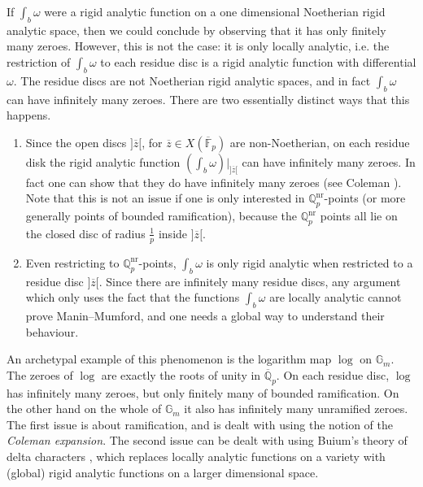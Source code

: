 \documentclass{amsart}
\def\Q{\mathbb Q}
\theoremstyle{definition}
\newcommand{\F}{\mathbb{F}}
\begin{document}
If $\int _b \omega $ were a rigid analytic function on a one dimensional Noetherian rigid analytic space, then we could conclude by observing that it has only finitely many zeroes. However, this is not the case: it is only locally analytic, i.e.  the restriction of $\int _b \omega $ to each residue disc is a rigid analytic function with differential $\omega $. The residue discs are not Noetherian rigid analytic spaces, and in fact $\int _b \omega $ can have infinitely many zeroes. There are two essentially distinct ways that this happens.

\begin{enumerate}
\item Since the open discs $]\overline{z}[$,  for $\overline{z}\in X(\overline{\F }_p )$ are non-Noetherian, on each residue disk the rigid analytic function $(\int _b \omega )|_{]\overline{z}[}$ can have infinitely many zeroes. In fact one can show that they do have infinitely many zeroes (see Coleman \cite{coleman:ramified}). Note that this is not an issue if one is only interested in $\Q _p ^{\mathrm{nr}}$-points (or more generally points of bounded ramification), because the $\Q _p ^{\mathrm{nr}}$ points all lie on the closed disc of radius $\frac{1}{p}$ inside $]\overline{z}[$. 
\item Even restricting to $\Q _p^{\mathrm{nr}}$-points, $\int _b \omega $ is only rigid analytic when restricted to a residue disc $]\overline{z}[$. Since there are infinitely many residue discs, any argument which only uses the fact that the functions $\int _b \omega $ are locally analytic cannot prove Manin--Mumford, and one needs a global way to understand their behaviour.
\end{enumerate}
An archetypal example of this phenomenon is the logarithm map $\log $ on $\mathbb{G}_m$. The zeroes of $\log $ are exactly the roots of unity in $\overline{\Q }_p $. On each residue disc, $\log $ has infinitely many zeroes, but only finitely many of bounded ramification. On the other hand on the whole of $\mathbb{G}_m $ it also has infinitely many unramified zeroes. The first issue is about ramification, and is dealt with using the notion of the \textit{Coleman expansion}. The second issue can be dealt with using Buium's theory of delta characters \cite{buium:95} \cite{buium:96}, which replaces locally analytic functions on a variety with (global) rigid analytic functions on a larger dimensional space.
\end{document}
